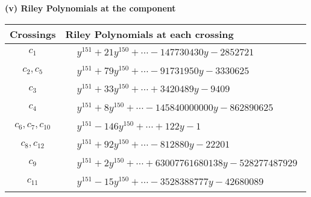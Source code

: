 \documentclass[1p]{elsarticle_modified}
\theoremstyle{definition}
\begin{document}
\newpage\renewcommand{\arraystretch}{1}
\flushleft \textbf{(v) Riley Polynomials at the component}\newline \\
\begin{tabular}{m{50pt}|m{274pt}}
Crossings & \hspace{64pt}Riley Polynomials at each crossing \\
\hline $$\begin{aligned}c_{1}\end{aligned}$$&$\begin{aligned}
&y^{151}+21 y^{150}+\cdots-147730430 y-2852721
\end{aligned}$\\
\hline $$\begin{aligned}c_{2},c_{5}\end{aligned}$$&$\begin{aligned}
&y^{151}+79 y^{150}+\cdots-91731950 y-3330625
\end{aligned}$\\
\hline $$\begin{aligned}c_{3}\end{aligned}$$&$\begin{aligned}
&y^{151}+33 y^{150}+\cdots+3420489 y-9409
\end{aligned}$\\
\hline $$\begin{aligned}c_{4}\end{aligned}$$&$\begin{aligned}
&y^{151}+8 y^{150}+\cdots-145840000000 y-862890625
\end{aligned}$\\
\hline $$\begin{aligned}c_{6},c_{7},c_{10}\end{aligned}$$&$\begin{aligned}
&y^{151}-146 y^{150}+\cdots+122 y-1
\end{aligned}$\\
\hline $$\begin{aligned}c_{8},c_{12}\end{aligned}$$&$\begin{aligned}
&y^{151}+92 y^{150}+\cdots-812880 y-22201
\end{aligned}$\\
\hline $$\begin{aligned}c_{9}\end{aligned}$$&$\begin{aligned}
&y^{151}+2 y^{150}+\cdots+63007761680138 y-528277487929
\end{aligned}$\\
\hline $$\begin{aligned}c_{11}\end{aligned}$$&$\begin{aligned}
&y^{151}-15 y^{150}+\cdots-3528388777 y-42680089
\end{aligned}$\\
\hline
\end{tabular}\\~\\
\end{document}
